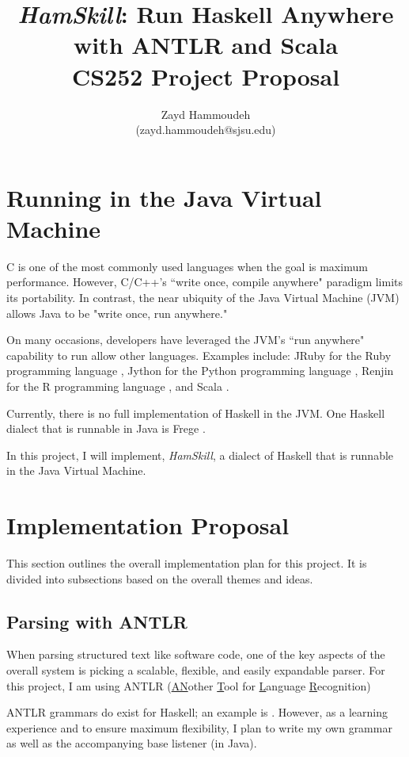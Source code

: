 \documentclass{report}
\title{\emph{HamSkill}: Run Haskell Anywhere \\
with ANTLR and Scala\\[1in]
	   CS252 Project Proposal}
\author{
  Zayd Hammoudeh \\
  (zayd.hammoudeh@sjsu.edu)
  }
\date{}
\begin{document}
\maketitle

\tableofcontents

\renewcommand\thesection{\arabic{section}}
\section{Running in the Java Virtual Machine}

C is one of the most commonly used languages when the goal is maximum performance.  However, C/C++'s ``write once, compile anywhere" paradigm limits its portability.  In contrast, the near ubiquity of the Java Virtual Machine (JVM) allows Java to be "write once, run anywhere."  

On many occasions, developers have leveraged the JVM's ``run anywhere" capability to run allow other languages.  Examples include: JRuby for the Ruby programming language \cite{jruby}, Jython for the Python programming language \cite{jython_jvm}, Renjin for the R programming language \cite{renjin}, and Scala \cite{scala}.

Currently, there is no full implementation of Haskell in the JVM.  One Haskell dialect that is runnable in Java is Frege \cite{frege}.  

In this project, I will implement, \emph{HamSkill}, a dialect of Haskell that is runnable in the Java Virtual Machine.

\section{Implementation Proposal}

This section outlines the overall implementation plan for this project.  It is divided into subsections based on the overall themes and ideas.  

\subsection{Parsing with ANTLR}

When parsing structured text like software code, one of the key aspects of the overall system is picking a scalable, flexible, and easily expandable parser.  For this project, I am using ANTLR (\underline{AN}other \underline{T}ool for \underline{L}anguage \underline{R}ecognition)

ANTLR grammars do exist for Haskell; an example is \cite{antlrHaskellLexer}.  However, as a learning experience and to ensure maximum flexibility, I plan to write my own grammar as well as the accompanying base listener (in Java).  
\end{document}
